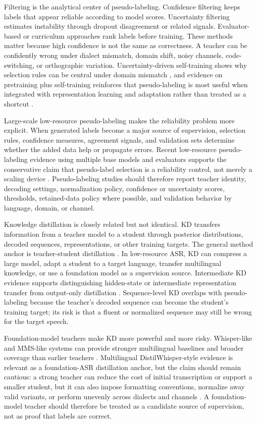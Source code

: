 \documentclass[pdflatex,sn-basic,iicol]{sn-jnl}
\theoremstyle{thmstyleone}
\theoremstyle{thmstyletwo}
\theoremstyle{thmstylethree}
\begin{document}
Filtering is the analytical center of pseudo-labeling. Confidence filtering keeps labels that appear reliable according to model scores. Uncertainty filtering estimates instability through dropout disagreement or related signals. Evaluator-based or curriculum approaches rank labels before training. These methods matter because high confidence is not the same as correctness. A teacher can be confidently wrong under dialect mismatch, domain shift, noisy channels, code-switching, or orthographic variation. Uncertainty-driven self-training shows why selection rules can be central under domain mismatch \citep{khurana2020dust}, and evidence on pretraining plus self-training reinforces that pseudo-labeling is most useful when integrated with representation learning and adaptation rather than treated as a shortcut \citep{xu2020selftraining}.

Large-scale low-resource pseudo-labeling makes the reliability problem more explicit. When generated labels become a major source of supervision, selection rules, confidence measures, agreement signals, and validation sets determine whether the added data help or propagate errors. Recent low-resource pseudo-labeling evidence using multiple base models and evaluators supports the conservative claim that pseudo-label selection is a reliability control, not merely a scaling device \citep{bhogale24_interspeech}. Pseudo-labeling studies should therefore report teacher identity, decoding settings, normalization policy, confidence or uncertainty scores, thresholds, retained-data policy where possible, and validation behavior by language, domain, or channel.

Knowledge distillation is closely related but not identical. KD transfers information from a teacher model to a student through posterior distributions, decoded sequences, representations, or other training targets. The general method anchor is teacher-student distillation \citep{hinton2015distilling}. In low-resource ASR, KD can compress a large model, adapt a student to a target language, transfer multilingual knowledge, or use a foundation model as a supervision source. Intermediate KD evidence supports distinguishing hidden-state or intermediate representation transfer from output-only distillation \citep{yoon2022interkd}. Sequence-level KD overlaps with pseudo-labeling because the teacher's decoded sequence can become the student's training target; its risk is that a fluent or normalized sequence may still be wrong for the target speech.

Foundation-model teachers make KD more powerful and more risky. Whisper-like and MMS-like systems can provide stronger multilingual baselines and broader coverage than earlier teachers \citep{pmlr-v202-radford23a,pratap2024mms}. Multilingual DistilWhisper-style evidence is relevant as a foundation-ASR distillation anchor, but the claim should remain cautious: a strong teacher can reduce the cost of initial transcription or support a smaller student, but it can also impose formatting conventions, normalize away valid variants, or perform unevenly across dialects and channels \citep{ferraz2023multilingualdistilwhisper}. A foundation-model teacher should therefore be treated as a candidate source of supervision, not as proof that labels are correct.
\end{document}
